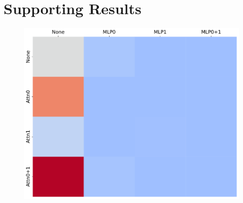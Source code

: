 \section{Supporting Results}





\begin{figure}[t]
  \centering
  \begin{minipage}{0.24\textwidth}
      \centering
      \label{fig:appendix-ablation-bos-lower}
      \vspace{-.2em}
      \includegraphics[width=\linewidth]{Figures/figures_circuit/interventions/bos_lower.pdf}
  \end{minipage}~
  \begin{minipage}{0.24\textwidth}
      \centering
      \label{fig:appendix-ablation-bos-upper}
      \vspace{-.2em}

\end{minipage}
\end{figure}

